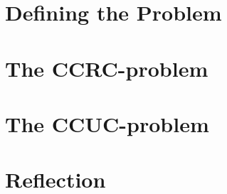 

\part{Defining the Problem}


\part{The CCRC-problem}



\part{The CCUC-problem}

\part{Reflection}




